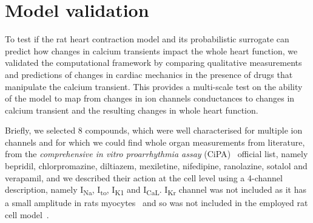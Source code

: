 %
%
%
\section{Model validation}\label{sec:validmethod}
To test if the rat heart contraction model and its probabilistic surrogate can predict how changes in calcium transients impact the whole heart function, we validated the computational framework by comparing qualitative measurements and predictions of changes in cardiac mechanics in the presence of drugs that manipulate the calcium transient. This provides a multi-scale test on the ability of the model to map from changes in ion channels conductances to changes in calcium transient and the resulting changes in whole heart function.

\vspace{0.2cm}
Briefly, we selected $8$ compounds, which were well characterised for multiple ion channels and for which we could find whole organ measurements from literature, from the \textit{comprehensive in vitro proarrhythmia assay} (\acs{CiPA})~\cite{Park:2019} official list, namely bepridil, chlorpromazine, diltiazem, mexiletine, nifedipine, ranolazine, sotalol and verapamil, and we described their action at the cell level using a 4-channel description, namely I\textsubscript{Na}, I\textsubscript{to}, I\textsubscript{K1} and I\textsubscript{CaL}. I\textsubscript{Kr} channel was not included as it has a small amplitude in rats myocytes~\cite{Wymore:1997} and so was not included in the employed rat cell model~\cite{Gattoni:2017}.

